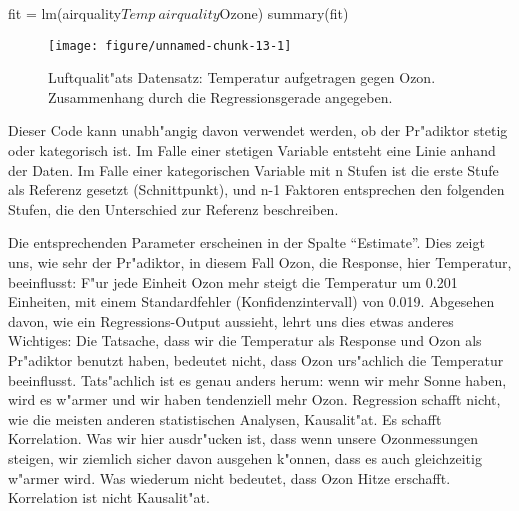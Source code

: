 \documentclass[a4paper,twoside]{tufte-book}\usepackage[]{graphicx}\usepackage[]{color}
\makeatletter
\def\maxwidth{ %
  \ifdim\Gin@nat@width>\linewidth
    \linewidth
  \else
    \Gin@nat@width
  \fi
}
\makeatother
\begin{document}
\begin{Schunk}
\begin{Sinput}
fit = lm(airquality$Temp~airquality$Ozone)
summary(fit)
\end{Sinput}
\end{Schunk}

\begin{figure}[htbp]
\begin{center}
\begin{Schunk}

\texttt{[image: figure/unnamed-chunk-13-1]} \end{Schunk}
\caption{Luftqualit"ats Datensatz: Temperatur aufgetragen gegen Ozon. Zusammenhang durch die Regressionsgerade angegeben.}
\label{fig: LR}
\end{center}
\end{figure}

Dieser Code kann unabh"angig davon verwendet werden, ob der Pr"adiktor stetig oder kategorisch ist. Im Falle einer stetigen Variable entsteht eine Linie anhand der Daten. Im Falle einer kategorischen Variable mit n Stufen ist die erste Stufe als Referenz gesetzt (Schnittpunkt), und n-1 Faktoren entsprechen den folgenden Stufen, die den Unterschied zur Referenz beschreiben.

Die entsprechenden Parameter erscheinen in der Spalte "`Estimate"'. Dies zeigt uns, wie sehr der Pr"adiktor, in diesem Fall Ozon, die Response, hier Temperatur, beeinflusst: F"ur jede Einheit Ozon mehr steigt die Temperatur um 0.201 Einheiten, mit einem Standardfehler (Konfidenzintervall) von 0.019. Abgesehen davon, wie ein Regressions-Output aussieht, lehrt uns dies etwas anderes Wichtiges: Die Tatsache, dass wir die Temperatur als Response und Ozon als Pr"adiktor benutzt haben, bedeutet nicht, dass Ozon urs"achlich die Temperatur beeinflusst. Tats"achlich ist es genau anders herum: wenn wir mehr Sonne haben, wird es w"armer und wir haben tendenziell mehr Ozon. Regression schafft nicht, wie die meisten anderen statistischen Analysen, Kausalit"at. Es schafft Korrelation. Was wir hier ausdr"ucken ist, dass wenn unsere Ozonmessungen steigen, wir ziemlich sicher davon ausgehen k"onnen, dass es auch gleichzeitig w"armer wird. Was wiederum nicht bedeutet, dass Ozon Hitze erschafft. Korrelation ist nicht Kausalit"at.
\end{document}
